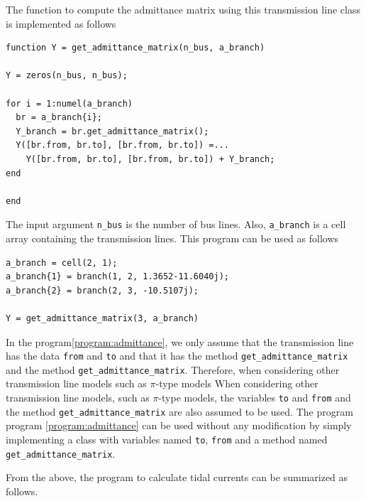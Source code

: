 \documentclass[tombow,dvipdfmx]{corona-a5-1.1}
\begin{document}
\begin{例}
The function to compute the admittance matrix using this transmission line class is implemented as follows
\smallskip
\begin{PROGRAMA}[count,title={get\_admittance\_matrix.m}]\label{program:admittance}
\begin{verbatim}
function Y = get_admittance_matrix(n_bus, a_branch)

Y = zeros(n_bus, n_bus);

for i = 1:numel(a_branch)
  br = a_branch{i};
  Y_branch = br.get_admittance_matrix();
  Y([br.from, br.to], [br.from, br.to]) =...
    Y([br.from, br.to], [br.from, br.to]) + Y_branch;
end

end
\end{verbatim}
\end{PROGRAMA}

The input argument \verb|n_bus| is the number of bus lines.
Also, \verb|a_branch| is a cell array containing the transmission lines.
This program can be used as follows

\smallskip
\begin{PROGRAMA}[count,title={main\_admittance\_matrix.m}]\label{program:main_admittance}
\begin{verbatim}
a_branch = cell(2, 1);
a_branch{1} = branch(1, 2, 1.3652-11.6040j);
a_branch{2} = branch(2, 3, -10.5107j);

Y = get_admittance_matrix(3, a_branch)
\end{verbatim}
\end{PROGRAMA}


In the program\nobreak\ref{program:admittance}, we only assume that the transmission line has the data \verb|from| and \verb|to| and that it has the method \verb|get_admittance_matrix| and the method \verb|get_admittance_matrix|.
Therefore, when considering other transmission line models such as $\pi$-type models When considering other transmission line models, such as $\pi$-type models, the variables \verb|to| and \verb|from| and the method \verb|get_admittance_matrix| are also assumed to be used.
The program program \nobreak\ref{program:admittance} can be used without any modification by simply implementing a class with variables named \verb|to|, \verb|from| and a method named \verb|get_admittance_matrix|.
\end{例}

From the above, the program to calculate tidal currents can be summarized as follows.
\end{document}
